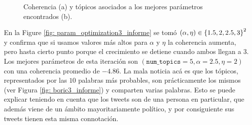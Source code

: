 \documentclass{article}
\begin{document}
	\begin{figure}[H]
		\centering
		\caption{Coherencia (a) y tópicos asociados a los mejores parámetros encontrados (b).}
	\end{figure}
	 
	
	En la Figure \ref{fig: param_optimization3_informe} se tomó $(\alpha, \eta)\in\left\{1.5, 2, 2.5, 3\right\}^2$ y confirma que si usamos valores más altos para $\alpha$ y $\eta$ la coherencia aumenta, pero hasta cierto punto porque el crecimiento se detiene cuando ambos llegan a $3$. Los mejores parámetros de esta iteración son $(\texttt{num\_topics}=5,\alpha=2.5, \eta=2)$ con una coherencia promedio de $-4.86$. La mala noticia acá es que los tópicos, representados por las $10$ palabras más probables, son prácticamente los mismos (ver Figura \ref{fig: boric3_informe}) y comparten varias palabras. Esto se puede explicar teniendo en cuenta que los tweets son de una persona en particular, que además viene de un ámbito mayoritariamente político, y por consiguiente sus tweets tienen esta misma connotación.
	
\end{document}
